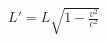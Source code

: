 \documentclass[preview]{standalone}
\begin{document}
\begin{align*}
L' = L \sqrt{1 - \frac{v^2}{c^2}}
\end{align*}
\end{document}
